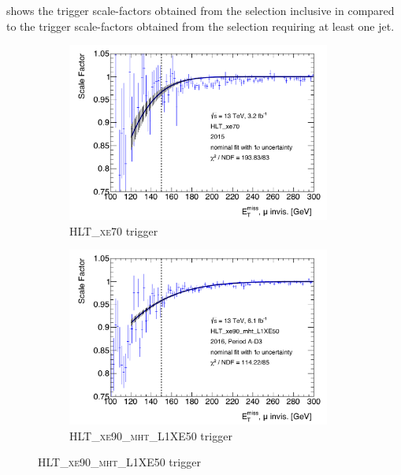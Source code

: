  shows the \met trigger scale-factors obtained from the selection inclusive in \bjets compared to the \met trigger scale-factors obtained from the selection requiring at least one \btagged jet.

\begin{figure}[htbp]
  \centering
  \begin{subfigure}{0.45\textwidth}
    \centering
    \includegraphics[width=0.95\textwidth]{figures/monoH/trigger/figures_TriggerScaleFactors_SF_HLT_xe70.pdf}
    \caption{\textsc{HLT\_xe70} \met trigger}
  \end{subfigure}
    \begin{subfigure}{0.45\textwidth}
    \centering
    \includegraphics[width=0.95\textwidth]{figures/monoH/trigger/figures_TriggerScaleFactors_SF_HLT_xe90_mht_L1XE50.pdf}
    \caption{\textsc{HLT\_xe90\_mht\_L1XE50} \met trigger}
  \end{subfigure}

\end{figure}
